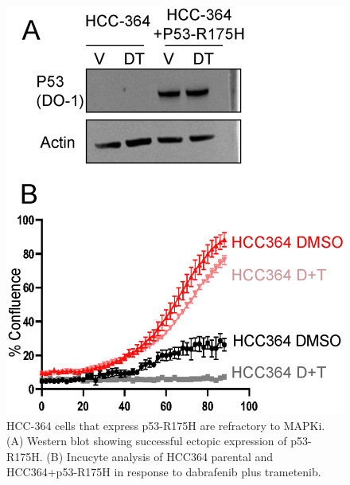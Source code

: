 \begin{figure}
\hypertarget{fig:3.10}{%
\centering
\includegraphics[width=1\textwidth,height=\textheight]{images/p538.png}
\caption{HCC-364 cells that express p53-R175H are refractory to MAPKi. (A) Western blot showing successful ectopic expression of p53-R175H. (B) Incucyte analysis of HCC364 parental and HCC364+p53-R175H in response to dabrafenib plus trametenib.}\label{fig:3.10}
}
\end{figure}

